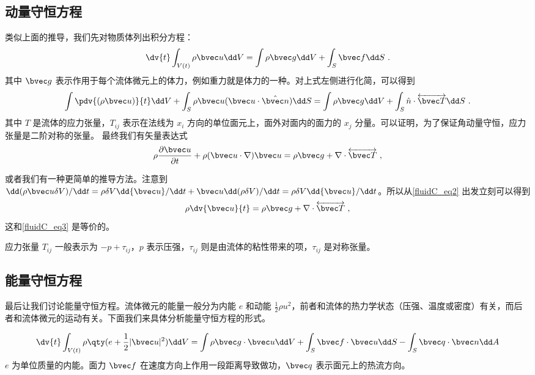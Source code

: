 \subsection{动量守恒方程}
类似上面的推导，我们先对物质体列出积分方程：
\begin{equation}\label{fluidC_eq2}
\dv{t}\int_{V(t)} \rho \bvec u \dd V=\int \rho \bvec g\dd V+\int_S \bvec f\dd S~.
\end{equation}
其中 $\bvec g$ 表示作用于每个流体微元上的体力，例如重力就是体力的一种。对上式左侧进行化简，可以得到
\begin{equation}
\int \pdv{(\rho \bvec u)}{t}\dd V+\int_S\rho \bvec u (\bvec u\cdot \hat{\bvec n})\dd S=\int \rho\bvec g\dd V+\int_S \hat n\cdot \overleftrightarrow {\bvec T}\dd S~.
\end{equation}
其中 $T$ 是流体的应力张量，$T_{ij}$ 表示在法线为 $x_i$ 方向的单位面元上，面外对面内的面力的 $x_j$ 分量。可以证明，为了保证角动量守恒，应力张量是二阶对称的张量。
最终我们有矢量表达式
\begin{equation}\label{fluidC_eq3}
\rho \frac{\partial \bvec u}{\partial t}+\rho(\bvec u\cdot \nabla)\bvec u=\rho \bvec g+\nabla\cdot \overleftrightarrow {\bvec T}~,
\end{equation}

或者我们有一种更简单的推导方法。注意到 $\dd(\rho \bvec u \delta V)/\dd t=\rho \delta V \dd {\bvec u}/\dd t+\bvec u \dd (\rho \delta V)/\dd t=\rho \delta V \dd {\bvec u}/\dd t$。所以从\autoref{fluidC_eq2} 出发立刻可以得到
\begin{equation}
\rho \dv{\bvec u}{t}=\rho \bvec g+\nabla\cdot \overleftrightarrow {\bvec T}~,
\end{equation}
这和\autoref{fluidC_eq3} 是等价的。

应力张量 $T_{ij}$ 一般表示为 $-p+\tau_{ij}$，$p$ 表示压强，$\tau_{ij}$ 则是由流体的粘性带来的项，$\tau_{ij}$ 是对称张量。

\subsection{能量守恒方程}
最后让我们讨论能量守恒方程。流体微元的能量一般分为内能 $e$ 和动能 $\frac{1}{2}\rho u^2$，前者和流体的热力学状态（压强、温度或密度）有关，而后者和流体微元的运动有关。下面我们来具体分析能量守恒方程的形式。

\begin{equation}
\dv{t} \int_{V(t)} \rho\qty(e+\frac{1}{2}|\bvec u|^2)\dd V=\int \rho \bvec g\cdot \bvec u \dd V+\int_S \bvec f\cdot \bvec u \dd S -\int_S \bvec q\cdot \bvec n\dd A
\end{equation}
$e$ 为单位质量的内能。面力 $\bvec f$ 在速度方向上作用一段距离导致做功，$\bvec q$ 表示面元上的热流方向。

